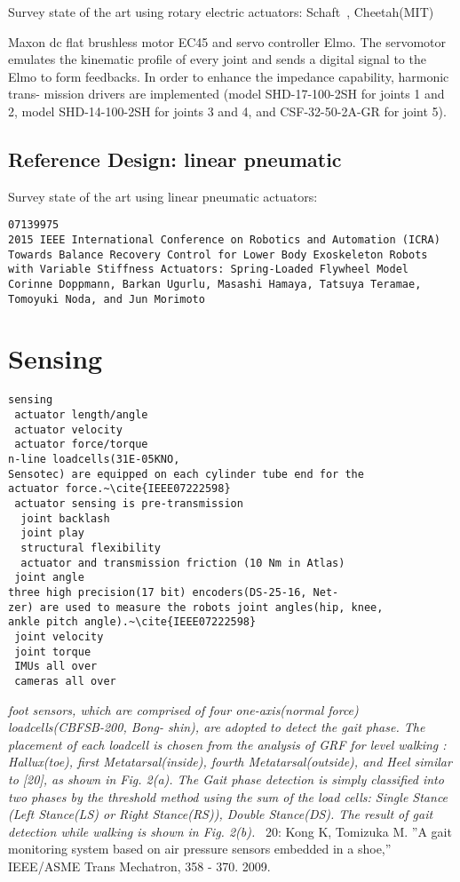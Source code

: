 \documentclass[letterpaper,12pt,fullpage]{article}
\begin{document}
Survey state of the art using rotary electric actuators:
Schaft~\cite{shaft_foot_placement,shaft_push_recov}, Cheetah(MIT)

Maxon dc flat brushless motor EC45 and servo controller
Elmo. The servomotor emulates the kinematic profile of every
joint and sends a digital signal to the Elmo to form feedbacks.
In order to enhance the impedance capability, harmonic trans-
mission drivers are implemented (model SHD-17-100-2SH
for joints 1 and 2, model SHD-14-100-2SH for joints 3 and 4,
and CSF-32-50-2A-GR for joint 5).~\cite{IEEE07128705}

\subsection{Reference Design: linear pneumatic}

Survey state of the art using linear pneumatic actuators:

\begin{verbatim}
07139975
2015 IEEE International Conference on Robotics and Automation (ICRA)
Towards Balance Recovery Control for Lower Body Exoskeleton Robots
with Variable Stiffness Actuators: Spring-Loaded Flywheel Model
Corinne Doppmann, Barkan Ugurlu, Masashi Hamaya, Tatsuya Teramae,
Tomoyuki Noda, and Jun Morimoto
\end{verbatim}

\section{Sensing}

\begin{verbatim}
sensing
 actuator length/angle
 actuator velocity
 actuator force/torque 
n-line loadcells(31E-05KNO,
Sensotec) are equipped on each cylinder tube end for the
actuator force.~\cite{IEEE07222598}
 actuator sensing is pre-transmission
  joint backlash
  joint play
  structural flexibility
  actuator and transmission friction (10 Nm in Atlas)
 joint angle
three high precision(17 bit) encoders(DS-25-16, Net-
zer) are used to measure the robots joint angles(hip, knee,
ankle pitch angle).~\cite{IEEE07222598}
 joint velocity
 joint torque
 IMUs all over
 cameras all over
\end{verbatim}

{\it foot sensors, which are comprised
of four one-axis(normal force) loadcells(CBFSB-200, Bong-
shin), are adopted to detect the gait phase. The placement
of each loadcell is chosen from the analysis of GRF for
level walking : Hallux(toe), first Metatarsal(inside), fourth
Metatarsal(outside), and Heel similar to [20], as shown in
Fig. 2(a). The Gait phase detection is simply classified
into two phases by the threshold method using the sum
of the load cells: Single Stance (Left Stance(LS) or Right
Stance(RS)), Double Stance(DS). The result of gait detection
while walking is shown in Fig. 2(b).}~\cite{IEEE07222598}
20: Kong K, Tomizuka M. ”A gait monitoring system based on air pressure
sensors embedded in a shoe,” IEEE/ASME Trans Mechatron, 358 - 370.
2009.
\end{document}
